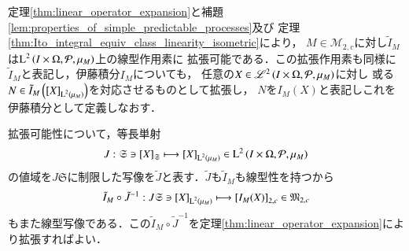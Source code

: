 	\begin{screen}
		\begin{thm}[伊藤積分の拡張]
			定理\ref{thm:linear_operator_expansion}と補題\ref{lem:properties_of_simple_predictable_processes}及び
			定理\ref{thm:Ito_integral_equiv_class_linearity_isometric}により，
			$M \in \mathcal{M}_{2,c}$に対し$\tilde{I}_M$は$\operatorname{L}^{2} \left(I \times \Omega,\mathcal{P},\mu_M\right)$上の線型作用素に
			拡張可能である．この拡張作用素も同様に$\tilde{I}_M$と表記し，伊藤積分$I_M$についても，
			任意の$X \in \mathscr{L}^{2} \left(I \times \Omega,\mathcal{P},\mu_M\right)$に対し
			或る$N \in \tilde{I}_M\left( \left[X\right]_{\operatorname{L}^{2} \left(\mu_M\right)} \right)$を対応させるものとして拡張し，
			$N$を$I_M(X)$と表記しこれを伊藤積分として定義しなおす．
		\end{thm}
	\end{screen}
	
	\begin{prf}
		拡張可能性について，等長単射
		\begin{align}
			J:\mathfrak{S} \ni \left[X\right]_{\mathfrak{S}} \longmapsto \left[X\right]_{\operatorname{L}^{2} \left(\mu_M\right)} \in \operatorname{L}^{2} \left(I \times \Omega,\mathcal{P},\mu_M\right)
		\end{align}
		の値域を$J\mathfrak{S}$に制限した写像を$\tilde{J}$と表す．$\tilde{J}$も$\tilde{I}_M$も線型性を持つから
		\begin{align}
			\tilde{I}_M \circ \tilde{J}^{-1}: J \mathfrak{S} \ni \left[X\right]_{\operatorname{L}^{2} \left(\mu_M\right)} \longmapsto \left[I_M(X)\right]_{2,c} \in \mathfrak{M}_{2,c}
		\end{align}
		もまた線型写像である．この$\tilde{I}_M \circ \tilde{J}^{-1}$を定理\ref{thm:linear_operator_expansion}により拡張すればよい．
		\QED
	\end{prf}